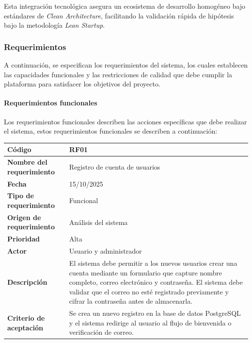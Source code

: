 Esta integración tecnológica asegura un ecosistema de desarrollo homogéneo bajo estándares de \textit{Clean Architecture}, facilitando la validación rápida de hipótesis bajo la metodología \textit{Lean Startup}.

{}
\subsubsection*{Requerimientos}

A continuación, se especifican los requerimientos del sistema, los cuales establecen las capacidades funcionales y las restricciones de calidad que debe cumplir la plataforma para satisfacer los objetivos del proyecto.

\paragraph*{Requerimientos funcionales}
Los requerimientos funcionales describen las acciones específicas que debe realizar el sistema, estos requerimientos funcionales se describen a continuación:

\begin{table}[H]
	\begin{tabular}{|a{5cm}|m{11cm}|}
		\hline
		\textbf{Código} & RF01 \\ \hline
		\textbf{Nombre del requerimiento} & Registro de cuenta de usuarios \\ \hline
		\textbf{Fecha} & 15/10/2025 \\ \hline
		\textbf{Tipo de requerimiento} & Funcional \\ \hline
		\textbf{Origen de requerimiento} & Análisis del sistema \\ \hline
		\textbf{Prioridad} & Alta \\ \hline
		\textbf{Actor} & Usuario y administrador \\ \hline
		\textbf{Descripción} & El sistema debe permitir a los nuevos usuarios crear una cuenta mediante un formulario que capture nombre completo, correo electrónico y contraseña. El sistema debe validar que el correo no esté registrado previamente y cifrar la contraseña antes de almacenarla.\\ \hline
		\textbf{Criterio de aceptación} & Se crea un nuevo registro en la base de datos PostgreSQL y el sistema redirige al usuario al flujo de bienvenida o verificación de correo. \\ \hline
	\end{tabular}
\end{table}

